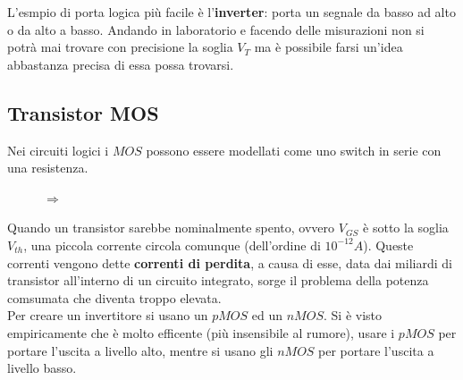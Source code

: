 \documentclass[12pt]{article}
\begin{document}
L'esmpio di porta logica pi\`u facile \`e l'\textbf{inverter}: porta un segnale da basso ad alto o da alto a basso. Andando in laboratorio e facendo delle misurazioni non si potr\`a mai trovare con precisione la soglia $V_T$ ma \`e possibile farsi un'idea abbastanza precisa di essa possa trovarsi.

\subsection{Transistor MOS}
Nei circuiti logici i $MOS$ possono essere modellati come uno switch in serie con una resistenza.
\begin{figure}[H]
    \centering
    \qquad
    $\Rightarrow$
    \qquad
\end{figure}

Quando un transistor sarebbe nominalmente spento, ovvero $V_{GS}$ \`e sotto la soglia $V_{th}$, una piccola corrente circola comunque (dell'ordine di $10^{-12}A$). Queste correnti vengono dette \textbf{correnti di perdita}, a causa di esse, data dai miliardi di transistor all'interno di un circuito integrato, sorge il problema della potenza comsumata che diventa troppo elevata. \\
Per creare un invertitore si usano un $pMOS$ ed un $nMOS$. Si \`e visto empiricamente che \`e molto efficente (pi\`u insensibile al rumore), usare i $pMOS$ per portare l'uscita a livello alto, mentre si usano gli $nMOS$ per portare l'uscita a livello basso. 
\end{document}
